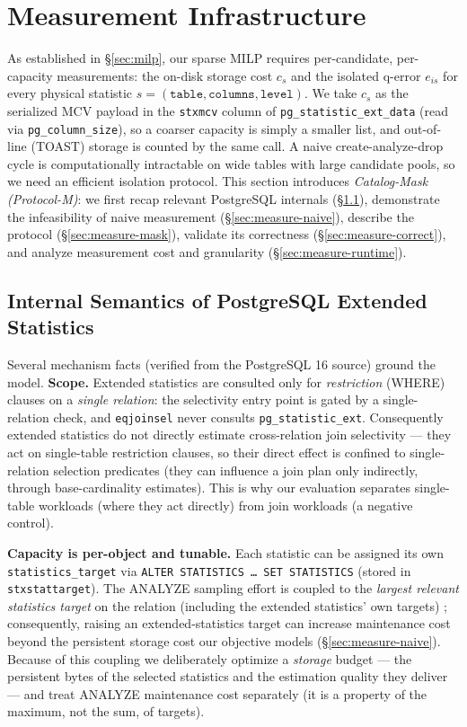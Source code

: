 \documentclass[sigconf, nonacm]{acmart}
\begin{document}
\section{Measurement Infrastructure}
\label{sec:measure}

As established in \S\ref{sec:milp}, our sparse MILP requires per-candidate,
per-capacity measurements: the on-disk storage cost $c_s$ and the isolated
q-error $e_{is}$ for every physical statistic
$s=(\texttt{table},\texttt{columns},\texttt{level})$. We take $c_s$ as the
serialized MCV payload in the \texttt{stxmcv} column of
\texttt{pg\_statistic\_ext\_data} (read via
\texttt{pg\_column\_size}\allowbreak), so a coarser capacity is simply a smaller
list, and out-of-line (TOAST) storage is counted by the same call. A naive
create-analyze-drop cycle is computationally intractable on wide tables with
large candidate pools, so we need an efficient isolation protocol. This section
introduces \emph{Catalog-Mask (Protocol-M)}: we first recap relevant PostgreSQL
internals (\S\ref{sec:mechanisms}), demonstrate the infeasibility of naive
measurement (\S\ref{sec:measure-naive}), describe the protocol
(\S\ref{sec:measure-mask}), validate its correctness (\S\ref{sec:measure-correct}),
and analyze measurement cost and granularity (\S\ref{sec:measure-runtime}).

\subsection{Internal Semantics of PostgreSQL Extended Statistics}
\label{sec:mechanisms}

Several mechanism facts (verified from the PostgreSQL 16 source) ground the
model. \textbf{Scope.} Extended statistics are consulted only for
\emph{restriction} (WHERE) clauses on a \emph{single relation}: the selectivity
entry point is gated by a single-relation check, and \texttt{eqjoinsel} never
consults \texttt{pg\_statistic\_ext}. Consequently extended statistics do not
directly estimate cross-relation join selectivity --- they act on single-table
restriction clauses, so their direct effect is confined to single-relation
selection predicates (they can influence a join plan only indirectly, through
base-cardinality estimates). This is why our evaluation separates single-table
workloads (where they act directly) from join workloads (a negative control).

\textbf{Capacity is per-object and tunable.} Each statistic can be assigned its
own \texttt{statistics\_}\allowbreak\texttt{target} via \texttt{ALTER STATISTICS}\allowbreak\texttt{ \dots\ SET STATISTICS}
(stored in \texttt{stxstattarget}). The ANALYZE sampling effort is coupled to the
\emph{largest relevant statistics target} on the relation (including the
extended statistics' own targets) \cite{pgstats}; consequently, raising an
extended-statistics target can increase maintenance cost beyond the persistent
storage cost our objective models (\S\ref{sec:measure-naive}). Because of this
coupling we deliberately optimize a \emph{storage} budget --- the persistent
bytes of the selected statistics and the estimation quality they deliver --- and
treat ANALYZE maintenance cost separately (it is a property of the maximum, not
the sum, of targets).
\end{document}
